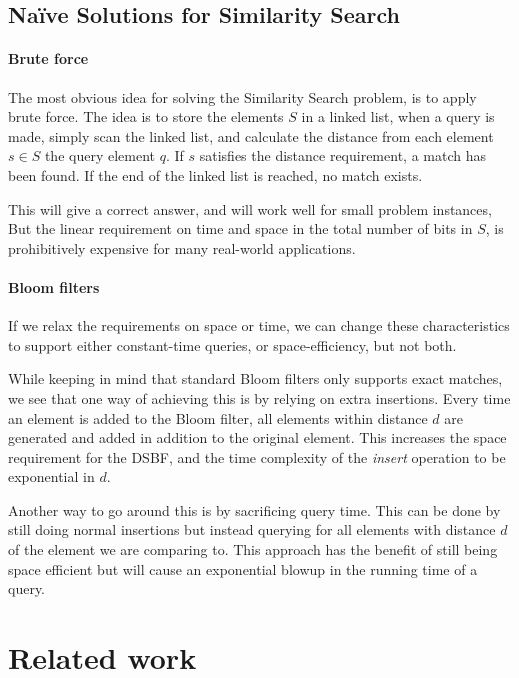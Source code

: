 \documentclass[a4paper,11pt]{article}
\begin{document}
\subsection{Naïve Solutions for Similarity Search}
\label{naive_approaches}

\paragraph{Brute force}
The most obvious idea for solving the Similarity Search problem, is to apply brute force. The idea is to store the elements $S$ in a linked list, when a query is made, simply scan the linked list, and calculate the distance from each element $s \in S$ the query element $q$. If $s$ satisfies the distance requirement, a match has been found. If the end of the linked list is reached, no match exists.

This will give a correct answer, and will work well for small problem instances, But the linear requirement on time and space in the total number of bits in $S$, is prohibitively expensive for many real-world applications.

\paragraph{Bloom filters} If we relax the requirements on space or time, we can change these characteristics to support either constant-time queries, or space-efficiency, but not both.

While keeping in mind that standard Bloom filters only supports exact matches, we see that one way of achieving this is by relying on extra insertions. Every time an element is added to the Bloom filter, all elements within distance $d$ are generated and added in addition to the original element. This increases the space requirement for the DSBF, and the time complexity of the \emph{insert} operation to be exponential in $d$.

Another way to go around this is by sacrificing query time. This can be done by still doing normal insertions but instead querying for all elements with distance $d$ of the element we are comparing to. This approach has the benefit of still being space efficient but will cause an exponential blowup in the running time of a query.

\section{Related work} %
\end{document}
